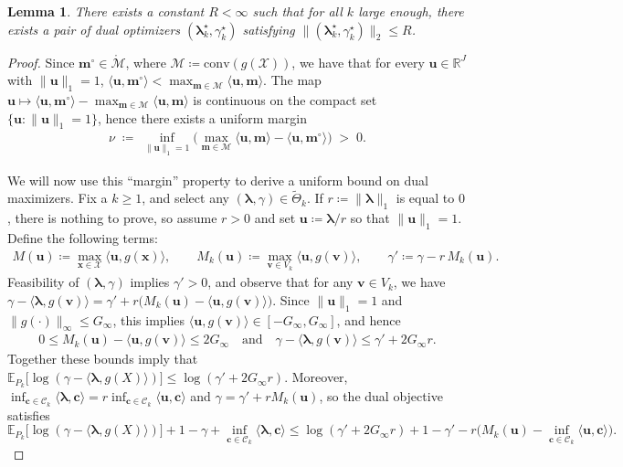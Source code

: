 \documentclass[10pt,a4paper]{amsart}
\newtheorem{lemma}{Lemma}
\newcommand{\R}{\mathbb{R}}
\newcommand{\boldlambda}{\boldsymbol{\lambda}}
\newcommand{\calC}{\mathcal C}
\newcommand{\calM}{\mathcal M}
\newcommand{\calX}{\mathcal X}
\newcommand{\cvec}{\mathbf{c}}
\newcommand{\mvec}{\mathbf{m}}
\newcommand{\uvec}{\mathbf{u}}
\newcommand{\vvec}{\mathbf{v}}
\newcommand{\xvec}{\mathbf{x}}
\begin{document}
\begin{lemma}\label{lemma:KL-general-limit-1}
There exists a constant $R<\infty$ such that for all $k$ large enough, there exists a pair of dual optimizers
$(\boldlambda_k^\star,\gamma_k^\star)$ satisfying $\|(\boldlambda_k^\star,\gamma_k^\star)\|_2\le R$.
\end{lemma}

\begin{proof}
Since $\mvec^{\circ}\in \mathring{\calM}$, where $\calM\coloneqq \mathrm{conv}(g(\calX))$, we have that for every $\uvec \in \R^J$ with $\|\uvec\|_1=1$, $\langle \uvec,\mvec^{\circ}\rangle < \max_{\mvec\in \calM}\langle \uvec,\mvec\rangle$.
The map $\uvec\mapsto \langle \uvec,\mvec^{\circ}\rangle-\max_{\mvec\in \calM}\langle \uvec,\mvec\rangle$ is continuous on the compact
set $\{\uvec:\|\uvec\|_1=1\}$, hence there exists a uniform margin
\begin{align}
\nu \;\coloneqq \;\inf_{\|\uvec\|_1=1}\Big(\max_{\mvec\in \calM}\langle \uvec,\mvec\rangle-\langle \uvec,\mvec^{\circ}\rangle\Big)\;>\;0.
\end{align}

We will now use this ``margin'' property to derive a uniform bound on dual maximizers. Fix a $k\ge 1$, and select any
$(\boldlambda,\gamma)\in \widetilde\Theta_k$. If $r\coloneqq \|\boldlambda\|_1$ is equal to $0$, there is nothing to prove, so assume $r>0$ and set
$\uvec\coloneqq \boldlambda/r$ so that $\|\uvec\|_1=1$. Define the following terms:
\begin{align}
M(\uvec)\coloneqq \max_{\xvec\in\calX}\langle \uvec,g(\xvec)\rangle, \qquad M_k(\uvec)\coloneqq \max_{\vvec\in V_k}\langle \uvec,g(\vvec)\rangle, \qquad \gamma'\coloneqq \gamma-r\,M_k(\uvec).
\end{align}
Feasibility of $(\boldlambda,\gamma)$ implies $\gamma'>0$, and observe that for any $\vvec\in V_k$, we have  $\gamma-\langle \boldlambda,g(\vvec)\rangle
=\gamma' + r\big(M_k(\uvec)-\langle \uvec,g(\vvec)\rangle\big)$.
Since $\|\uvec\|_1=1$ and $\|g(\cdot)\|_\infty\le G_\infty$, this implies $\langle \uvec,g(\vvec)\rangle\in[-G_\infty,G_\infty]$, and hence
\begin{align}
0\le M_k(\uvec)-\langle \uvec,g(\vvec)\rangle\le 2G_\infty \quad\text{and}\quad \gamma-\langle \boldlambda,g(\vvec)\rangle\le \gamma'+2G_\infty r.
\end{align}
Together these bounds imply that $ \mathbb E_{P_k}\!\big[\log(\gamma-\langle \boldlambda,g(X)\rangle)\big]\le \log(\gamma'+2G_\infty r)$. 
Moreover, $\inf_{\cvec\in\calC_k}\langle \boldlambda,\cvec\rangle=r\inf_{\cvec\in\calC_k}\langle \uvec,\cvec\rangle$ and
$\gamma=\gamma'+rM_k(\uvec)$, so the dual objective satisfies
\[
\mathbb E_{P_k}\!\big[\log(\gamma-\langle \boldlambda,g(X)\rangle)\big] + 1-\gamma + \inf_{\cvec\in\calC_k}\langle \boldlambda,\cvec\rangle
\le
\log(\gamma'+2G_\infty r) + 1-\gamma' - r\Big(M_k(\uvec)-\inf_{\cvec\in\calC_k}\langle \uvec,\cvec\rangle\Big).
\label{eq:KL-general-proof-1}
\]


\end{proof}
\end{document}
